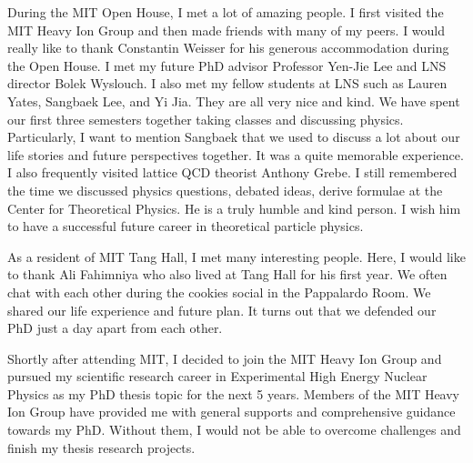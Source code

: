 During the MIT Open House, I met a lot of amazing people. I first visited the MIT Heavy Ion Group and then made friends with many of my peers. I would really like to thank Constantin Weisser for his generous accommodation during the Open House. I met my future PhD advisor Professor Yen-Jie Lee and LNS director Bolek Wyslouch. I also met my fellow students at LNS such as Lauren Yates, Sangbaek Lee, and Yi Jia. They are all very nice and kind. We have spent our first three semesters together taking classes and discussing physics. Particularly, I want to mention Sangbaek that we used to discuss a lot about our life stories and future perspectives together. It was a quite memorable experience. I also frequently visited lattice QCD theorist Anthony Grebe. I still remembered the time we discussed physics questions, debated ideas, derive formulae at the Center for Theoretical Physics. He is a truly humble and kind person. I wish him to have a successful future career in theoretical particle physics.


As a resident of MIT Tang Hall, I met many interesting people. Here, I would like to thank Ali Fahimniya who also lived at Tang Hall for his first year. We often chat with each other during the cookies social in the Pappalardo Room. We shared our life experience and future plan. It turns out that we defended our PhD just a day apart from each other. 

Shortly after attending MIT, I decided to join the MIT Heavy Ion Group and pursued my scientific research career in Experimental High Energy Nuclear Physics as my PhD thesis topic for the next 5 years. Members of the MIT Heavy Ion Group have provided me with general supports and comprehensive guidance towards my PhD. Without them, I would not be able to overcome challenges and finish my thesis research projects. 


